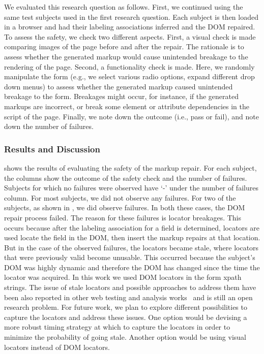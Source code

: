 We evaluated this research question as follows. 
First, we continued using the same test subjects used in the first 
research question. Each subject is then loaded in a browser 
and had their labeling associations inferred and the DOM repaired. 
To assess the safety, we check two different aspects. First, 
a visual check is made comparing images of the page before and 
after the repair. The rationale is to assess whether the generated 
markup would cause unintended breakage to the rendering of the page. 
Second, a functionality check is made. Here, we randomly manipulate 
the form (e.g., we select various radio options, expand different drop down menus) to assess whether the generated markup caused  unintended breakage to the form. Breakages might occur, for instance, if the generated markups are incorrect, or break some element or attribute dependencies in the script of the page. Finally, we note down the outcome (i.e., pass or fail), and note down the number of failures. 


\subsubsection{Results and Discussion}
 shows the results of evaluating the safety of 
the markup repair. For each subject, the columns show the 
outcome of the safety check and the number of failures. Subjects 
for which no failures were observed have `-' under the number of 
failures column. For most subjects, we did not observe any failures. 
For two of the subjects, as shown in , we did 
observe failures. In both these cases, the DOM repair process  failed. The reason for these failures is locator breakages. This occurs 
because after the labeling association for a field is determined, 
locators are used locate the field in the DOM, then insert the markup 
repairs at that location. But in the case of the observed failures, 
the locators became stale, where locators that were 
previously valid become unusable. This occurred because the subject's 
DOM was highly dynamic and therefore the DOM has changed 
since the time the locator was acquired. In this work we used DOM 
locators in the form xpath strings. The issue of stale locators 
and possible approaches to address them have been also reported in 
other web testing and analysis works~\cite{leotta2016robula, kirinuki2019color} 
and is still an open research problem. 
For future work, we plan to explore different possibilities to capture 
the locators and address these issues. One option would be devising a 
more robust timing strategy at which to capture the locators in order to 
minimize the probability of going stale. Another option would be using 
visual locators instead of DOM locators. 
 
